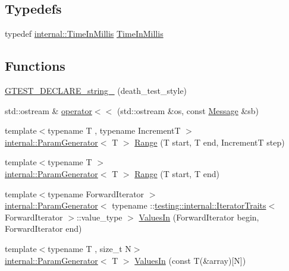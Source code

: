 \subsection*{Typedefs}
\begin{DoxyCompactItemize}
\item 
typedef \hyperlink{namespacetesting_1_1internal_a66a845df404b38fe85c5e14a069f255a}{internal\+::\+Time\+In\+Millis} \hyperlink{namespacetesting_a992de1d091ce660f451d1e8b3ce30fd6}{Time\+In\+Millis}
\end{DoxyCompactItemize}
\subsection*{Functions}
\begin{DoxyCompactItemize}
\item 
\hyperlink{namespacetesting_a37b7e87f0a5f502c6918f37d1768c1f3}{G\+T\+E\+S\+T\+\_\+\+D\+E\+C\+L\+A\+R\+E\+\_\+string\+\_\+} (death\+\_\+test\+\_\+style)
\item 
std\+::ostream \& \hyperlink{namespacetesting_a7b802e532fd68749765cb7dc156130db}{operator$<$$<$} (std\+::ostream \&os, const \hyperlink{classtesting_1_1Message}{Message} \&sb)
\item 
{\footnotesize template$<$typename T , typename IncrementT $>$ }\\\hyperlink{classtesting_1_1internal_1_1ParamGenerator}{internal\+::\+Param\+Generator}$<$ T $>$ \hyperlink{namespacetesting_a265ed70a86cf2d6641582c45ad9529e2}{Range} (T start, T end, IncrementT step)
\item 
{\footnotesize template$<$typename T $>$ }\\\hyperlink{classtesting_1_1internal_1_1ParamGenerator}{internal\+::\+Param\+Generator}$<$ T $>$ \hyperlink{namespacetesting_a56a45f85a1238dfc92e6fca03eb3a2e4}{Range} (T start, T end)
\item 
{\footnotesize template$<$typename Forward\+Iterator $>$ }\\\hyperlink{classtesting_1_1internal_1_1ParamGenerator}{internal\+::\+Param\+Generator}$<$ typename \+::\hyperlink{structtesting_1_1internal_1_1IteratorTraits}{testing\+::internal\+::\+Iterator\+Traits}$<$ Forward\+Iterator $>$\+::value\+\_\+type $>$ \hyperlink{namespacetesting_a96240380ae4d3b4855d07de3b84fb336}{Values\+In} (Forward\+Iterator begin, Forward\+Iterator end)
\item 
{\footnotesize template$<$typename T , size\+\_\+t N$>$ }\\\hyperlink{classtesting_1_1internal_1_1ParamGenerator}{internal\+::\+Param\+Generator}$<$ T $>$ \hyperlink{namespacetesting_a0b9ea6594ac06ad5d9eba2511ffa0fb7}{Values\+In} (const T(\&array)\mbox{[}N\mbox{]})

\end{DoxyCompactItemize}
